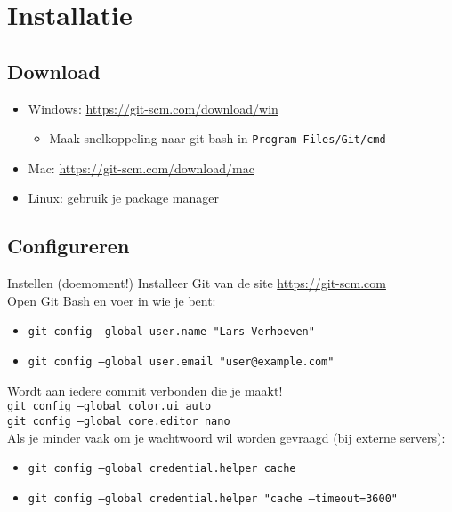 \section[Get git]{Installatie}

\subsection{Download}
\begin{frame}
	\begin{itemize}
		\item Windows: \url{https://git-scm.com/download/win}
			\begin{itemize}
				\item \small{Maak snelkoppeling naar git-bash in \tt{Program Files/Git/cmd}}
			\end{itemize}
		\item Mac: \url{https://git-scm.com/download/mac}
		\item Linux: gebruik je package manager
	\end{itemize}
\end{frame}

\subsection{Configureren}
\begin{frame}{Instellen (doemoment!)}
	Installeer Git van de site \url{https://git-scm.com}\\

	Open Git Bash en voer in wie je bent:
	\begin{itemize}
		\item \tt{git config --global user.name "Lars Verhoeven"}
		\item \tt{git config --global user.email "user@example.com"}
	\end{itemize}
	{\small\alert{Wordt aan iedere commit verbonden die je maakt!}}\\

	\texttt{git config --global color.ui auto}\\
	\texttt{git config --global core.editor nano}\\

	Als je minder vaak om je wachtwoord wil worden gevraagd (bij externe servers):

	\begin{itemize}
		\item \tt{git config --global credential.helper cache}
		\item \tt{git config --global credential.helper "cache --timeout=3600"}
	\end{itemize}
\end{frame}

